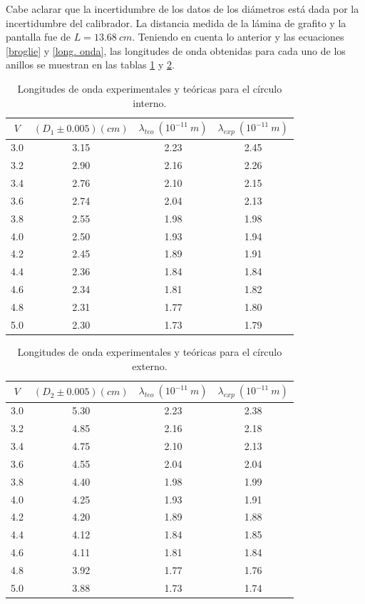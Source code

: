 \documentclass[prb,aps,twocolumn,preprintnumbers,amsmath,amssymb]{revtex4}
\begin{document}
Cabe aclarar que la incertidumbre de los datos de los diámetros está dada por la incertidumbre del calibrador. La distancia medida	de la lámina de grafito y la pantalla fue de $L = 13.68\ cm$. Teniendo en cuenta lo anterior y las ecuaciones \eqref{broglie} y \eqref{long. onda}, las longitudes de onda obtenidas para cada uno de los anillos se muestran en las tablas \ref{Tabla 2} y \ref{Tabla 3}.

\begin{table}[h!]
	\caption{\label{Tabla 2}Longitudes de onda experimentales y teóricas para el círculo interno.}
	\begin{ruledtabular}
		\begin{tabular}{|cccc|}
			$V$ & $(D_{1} \pm 0.005)(cm)$ & $\lambda_{teo}\ (10^{-11}\ m)$ & $\lambda_{exp}\ (10^{-11}\ m)$\\
			\hline
			3.0 & 3.15 & 2.23 & 2.45\\
			3.2 & 2.90 & 2.16 & 2.26\\
			3.4 & 2.76 & 2.10 & 2.15\\
			3.6 & 2.74 & 2.04 & 2.13\\
			3.8 & 2.55 & 1.98 & 1.98\\
			4.0 & 2.50 & 1.93 & 1.94\\
			4.2 & 2.45 & 1.89 & 1.91\\
			4.4 & 2.36 & 1.84 & 1.84\\
			4.6 & 2.34 & 1.81 & 1.82\\
			4.8 & 2.31 & 1.77 & 1.80\\
			5.0 & 2.30 & 1.73 & 1.79\\
		\end{tabular}
	\end{ruledtabular}
\end{table}

\begin{table}[h!]
	\caption{\label{Tabla 3}Longitudes de onda experimentales y teóricas para el círculo externo.}
	\begin{ruledtabular}
		\begin{tabular}{|cccc|}
			$V$ & $(D_{2} \pm 0.005)(cm)$ & $\lambda_{teo}\ (10^{-11}\ m)$ & $\lambda_{exp}\ (10^{-11}\ m)$\\
			\hline
			3.0 & 5.30 & 2.23 & 2.38\\
			3.2 & 4.85 & 2.16 & 2.18\\
			3.4 & 4.75 & 2.10 & 2.13\\
			3.6 & 4.55 & 2.04 & 2.04\\
			3.8 & 4.40 & 1.98 & 1.99\\
			4.0 & 4.25 & 1.93 & 1.91\\
			4.2 & 4.20 & 1.89 & 1.88\\
			4.4 & 4.12 & 1.84 & 1.85\\
			4.6 & 4.11 & 1.81 & 1.84\\
			4.8 & 3.92 & 1.77 & 1.76\\
			5.0 & 3.88 & 1.73 & 1.74\\
		\end{tabular}
	\end{ruledtabular}
\end{table}
\end{document}
